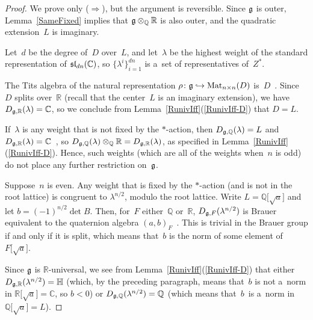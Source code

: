 \begin{proof}
We prove only ($\Rightarrow$), but the argument is reversible.
Since $\Lie G$ is outer, Lemma~\ref{SameFixed} implies that $\Lie G \otimes_\mathbb{Q} \mathbb{R}$ is also outer, and the
quadratic extension~$L$ is imaginary.

Let~$d$ be the degree of~$D$ over~$L$, and let~$\lambda$ be the highest weight of the standard representation of
$\Lie{SL}_{dn}(\mathbb{C})$, so $\{\lambda^i\}_{i=1}^{dn}$ is a~set of representatives of~$Z^*$.

The Tits algebra of the natural representation $\rho \colon \Lie G \hookrightarrow \Mat_{n \times n}(D)$
is~$D$~\cite[p.~378]{KnusEtAl-BookOfInvols}.
Since~$D$ splits over~$\mathbb{R}$ (recall that the center~$L$ is an imaginary extension),
we have $D_{\Lie G, \mathbb{R}}(\lambda) = \mathbb{C}$, so we conclude from Lemma~\ref{RunivIff}(\ref{RunivIff-D})
that $D = L$.

If~$\lambda$ is any weight that is not f\/ixed by the $*$-action, then $D_{\Lie G, \mathbb{Q}}(\lambda) = L$ and $D_{\Lie
G, \mathbb{R}}(\lambda) = \mathbb{C}$~\cite[p.~378]{KnusEtAl-BookOfInvols}, so $D_{\Lie G, \mathbb{Q}}(\lambda)
\otimes_\mathbb{Q} \mathbb{R} = D_{\Lie G, \mathbb{R}}(\lambda)$, as specif\/ied in Lemma~\ref{RunivIff}(\ref{RunivIff-D}).
Hence, such weights (which are all of the weights when~$n$ is odd) do not place any further restriction on~$\Lie G$.

Suppose~$n$ is even.
Any weight that is f\/ixed by the $*$-action (and is not in the root lattice) is congruent to $\lambda^{n/2}$, modulo the
root lattice.
Write $L = \mathbb{Q} \bigl[\sqrt{a} \bigr]$ and let $b = (-1)^{n/2} \det B$.
Then, for~$F$ either~$\mathbb{Q}$ or~$\mathbb{R}$, $D_{\Lie G, F}(\lambda^{n/2})$ is Brauer equivalent to the quaternion
algebra $(a,b)_F$~\cite[p.~378 and Corollary~10.35 on p.~131)]{KnusEtAl-BookOfInvols}.
This is trivial in the Brauer group if and only if it is split, which means that~$b$ is the norm of some element of $F
\bigl[\sqrt{a} \bigr]$.

Since $\Lie G$ is $\mathbb{R}$-universal, we see from Lemma~\ref{RunivIff}(\ref{RunivIff-D}) that either $D_{\Lie G,
\mathbb{R}}(\lambda^{n/2}) = \mathbb{H}$ (which, by the preceding paragraph, means that~$b$ is not a~norm in $\mathbb{R}
\bigl[\sqrt{a} \bigr] = \mathbb{C}$, so $b < 0$) or $D_{\Lie G, \mathbb{Q}}(\lambda^{n/2}) = \mathbb{Q}$ (which means
that~$b$~is a~norm in $\mathbb{Q} \bigl[\sqrt{a} \bigr] = L$).
\end{proof}

